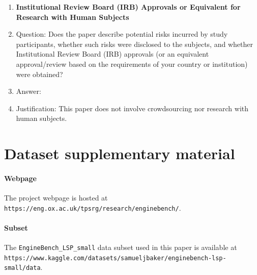 \documentclass{article}
\begin{document}
\begin{enumerate}
\item {\bf Institutional Review Board (IRB) Approvals or Equivalent for Research with Human Subjects}
    \item[] Question: Does the paper describe potential risks incurred by study participants, whether such risks were disclosed to the subjects, and whether Institutional Review Board (IRB) approvals (or an equivalent approval/review based on the requirements of your country or institution) were obtained?
    \item[] Answer: \answerNA{} %
    \item[] Justification: This paper does not involve crowdsourcing nor research with human subjects.

\end{enumerate}

\clearpage
\section{Dataset supplementary material}
\paragraph{Webpage}
The project webpage is hosted at \texttt{https://eng.ox.ac.uk/tpsrg/research/enginebench/}. 
\paragraph{Subset}
The \texttt{EngineBench\_LSP\_small} data subset used in this paper is available at \texttt{https://www.kaggle.com/datasets/samueljbaker/enginebench-lsp-small/data}.
\end{document}
